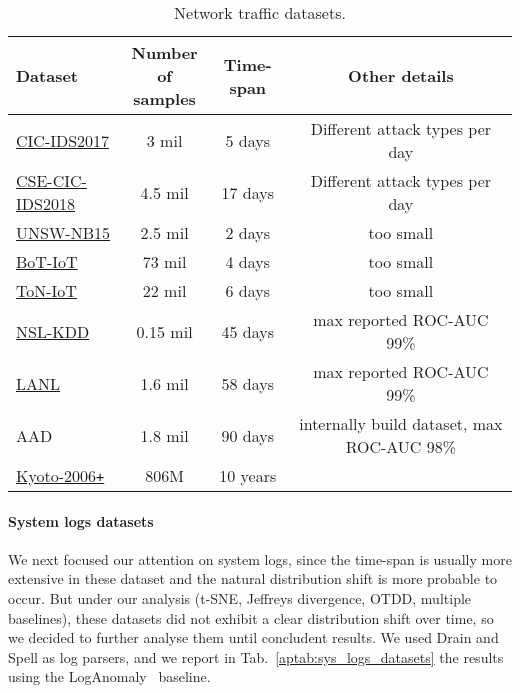 \documentclass{article}
\begin{document}
\begingroup
\begin{table}[t]
\begin{center}
    \caption{Network traffic datasets.}
    
    \begin{tabular}{lccc}
    \toprule
    Dataset  & \shortstack{Number\\ of\\ samples }& Time-span & Other details \\
    \midrule
    \href{https://www.unb.ca/cic/datasets/ids-2017.html}{CIC-IDS2017} & 3 mil & 5 days & Different attack types per day\\
    \href{https://www.unb.ca/cic/datasets/ids-2018.html}{CSE-CIC-IDS2018} &  4.5 mil & 17 days & Different attack types per day \\
    \href{https://research.unsw.edu.au/projects/unsw-nb15-dataset}{UNSW-NB15} & 2.5 mil   & 2 days & too small 	\\
    \href{https://research.unsw.edu.au/projects/bot-iot-dataset}{BoT-IoT} &  73 mil   &  4 days  & too small	\\
    \href{https://research.unsw.edu.au/projects/toniot-datasets}{ToN-IoT} & 22 mil  & 6 days & too small \\
    \href{https://www.unb.ca/cic/datasets/nsl.html}{NSL-KDD} & 0.15 mil  & 45 days & max reported ROC-AUC 99\%\\
    \href{https://arxiv.org/abs/1803.04967}{LANL} &  1.6 mil & 58 days   & max reported ROC-AUC 99\%\\
    AAD   & 1.8 mil  & 90 days  & internally build dataset, max ROC-AUC  98\%\\
    \href{http://www.takakura.com/Kyoto_data/}{Kyoto-2006\texttt{+}} &  806M & 10 years  \\
    \bottomrule
    \end{tabular}

    \label{aptab:net_traffic_datasets}
\end{center}
\end{table}
\endgroup


\paragraph{System logs datasets}
We next focused our attention on system logs, since the time-span is usually more extensive in these dataset and the natural distribution shift is more probable to occur. But under our analysis (t-SNE, Jeffreys divergence, OTDD, multiple baselines), these datasets did not exhibit a clear distribution shift over time, so we decided to further analyse them until concludent results. We used Drain and Spell as log parsers, and we report in Tab.~\ref{aptab:sys_logs_datasets} the results using the LogAnomaly~\cite{loganomaly} baseline.
\end{document}
